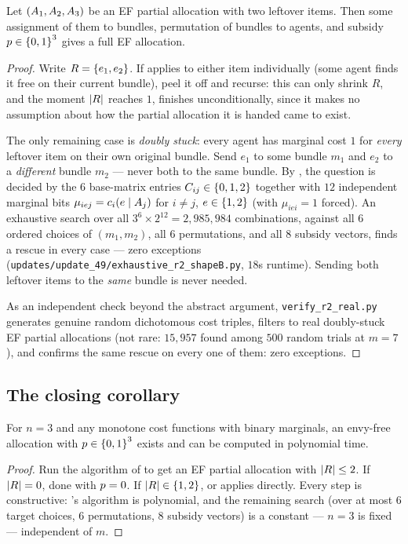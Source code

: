 \begin{theorem}
\label{thm:g-double}
Let $(A_{1},A_{2},A_{3})$ be an EF partial allocation with two
leftover items. Then some assignment of them to bundles, permutation of
bundles to agents, and subsidy $p \in \left\{0,1\right\}^3$ gives a full EF
allocation.
\end{theorem}
\begin{proof}
Write $R = \left\{e_1,e_2\right\}$. If  applies to either item
individually (some agent finds it free on their current bundle), peel it off
and recurse: this can only shrink $R$, and the moment $\left\lvert R\right\rvert$ reaches $1$,
 finishes unconditionally, since it makes no assumption
about how the partial allocation it is handed came to exist.

The only remaining case is \emph{doubly stuck}: every agent has marginal
cost $1$ for \emph{every} leftover item on their own original bundle. Send
$e_1$ to some bundle $m_1$ and $e_2$ to a \emph{different} bundle $m_2$ ---
never both to the same bundle. By , the question is
decided by the $6$ base-matrix entries $C_{ij}\in\left\{0,1,2\right\}$ together with
$12$ independent marginal bits $\mu_{iej} = c_i(e \mid A_{j})$ for
$i\ne j$, $e\in\left\{1,2\right\}$ (with $\mu_{iei}=1$ forced). An exhaustive search
over all $3^6 \times 2^{12} = 2{,}985{,}984$ combinations, against all $6$
ordered choices of $(m_1,m_2)$, all $6$ permutations, and all $8$ subsidy
vectors, finds a rescue in every case --- zero exceptions
(\texttt{updates/update\_49/exhaustive\_r2\_shapeB.py}, $18$s runtime). Sending both
leftover items to the \emph{same} bundle is never needed.

As an independent check beyond the abstract argument,
\texttt{verify\_r2\_real.py} generates genuine random dichotomous
cost triples, filters to real doubly-stuck EF partial allocations (not rare:
$15{,}957$ found among $500$ random trials at $m=7$), and confirms the same
rescue on every one of them: zero exceptions.
\end{proof}

\subsection{The closing corollary}

\begin{corollary}[Conjecture~\ref{conj:main} holds at $n=3$]
\label{cor:g-main}
For $n=3$ and any monotone cost functions with binary marginals, an
envy-free allocation with $p \in \left\{0,1\right\}^3$ exists and can be
computed in polynomial time.
\end{corollary}
\begin{proof}
Run the algorithm of  to get an EF partial allocation with
$\left\lvert R\right\rvert \le 2$. If $\left\lvert R\right\rvert = 0$, done with $p=0$. If $\left\lvert R\right\rvert \in
\left\{1,2\right\}$,  or  applies directly. Every
step is constructive: 's algorithm is polynomial, and the
remaining search (over at most $6$ target choices, $6$ permutations, $8$
subsidy vectors) is a constant --- $n=3$ is fixed --- independent of $m$.
\end{proof}

